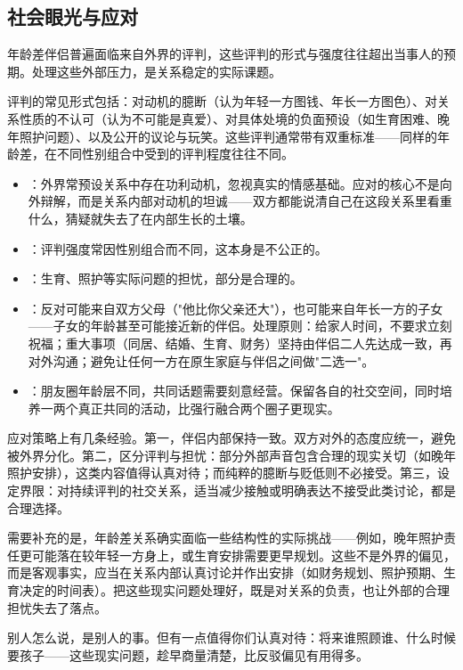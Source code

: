 \subsection{社会眼光与应对}

年龄差伴侣普遍面临来自外界的评判，这些评判的形式与强度往往超出当事人的预期。处理这些外部压力，是关系稳定的实际课题。

评判的常见形式包括：对动机的臆断（认为年轻一方图钱、年长一方图色）、对关系性质的不认可（认为不可能是真爱）、对具体处境的负面预设（如生育困难、晚年照护问题）、以及公开的议论与玩笑。这些评判通常带有双重标准——同样的年龄差，在不同性别组合中受到的评判程度往往不同。

\begin{itemize}
  \item {}：外界常预设关系中存在功利动机，忽视真实的情感基础。应对的核心不是向外辩解，而是关系内部对动机的坦诚——双方都能说清自己在这段关系里看重什么，猜疑就失去了在内部生长的土壤。
  \item {}：评判强度常因性别组合而不同，这本身是不公正的。
  \item {}：生育、照护等实际问题的担忧，部分是合理的。
  \item {}：反对可能来自双方父母（"他比你父亲还大"），也可能来自年长一方的子女——子女的年龄甚至可能接近新的伴侣。处理原则：给家人时间，不要求立刻祝福；重大事项（同居、结婚、生育、财务）坚持由伴侣二人先达成一致，再对外沟通；避免让任何一方在原生家庭与伴侣之间做"二选一"。
  \item {}：朋友圈年龄层不同，共同话题需要刻意经营。保留各自的社交空间，同时培养一两个真正共同的活动，比强行融合两个圈子更现实。
\end{itemize}

应对策略上有几条经验。第一，伴侣内部保持一致。双方对外的态度应统一，避免被外界分化。第二，区分评判与担忧：部分外部声音包含合理的现实关切（如晚年照护安排），这类内容值得认真对待；而纯粹的臆断与贬低则不必接受。第三，设定界限：对持续评判的社交关系，适当减少接触或明确表达不接受此类讨论，都是合理选择。

需要补充的是，年龄差关系确实面临一些结构性的实际挑战——例如，晚年照护责任更可能落在较年轻一方身上，或生育安排需要更早规划。这些不是外界的偏见，而是客观事实，应当在关系内部认真讨论并作出安排（如财务规划、照护预期、生育决定的时间表）。把这些现实问题处理好，既是对关系的负责，也让外部的合理担忧失去了落点。

\begin{tcolorbox}[colback=pink!5!white,colframe=red!50!black,title=贴心小叮咛]
别人怎么说，是别人的事。但有一点值得你们认真对待：将来谁照顾谁、什么时候要孩子——这些现实问题，趁早商量清楚，比反驳偏见有用得多。
\end{tcolorbox}
